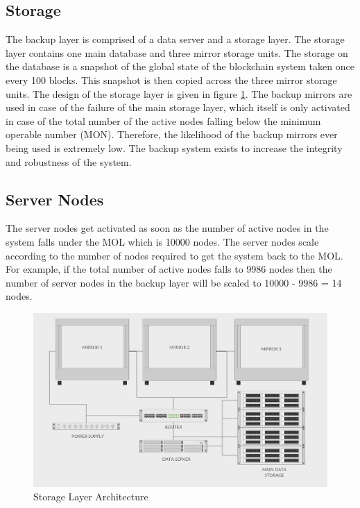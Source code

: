 \documentclass[a4paper,twoside,phd]{BYUPhys}
\begin{document}
\subsection{Storage}
The backup layer is comprised of a data server and a storage layer. The storage layer contains one main database and three mirror storage units. The storage on the database is a snapshot of the global state of the blockchain system taken once every 100 blocks. This snapshot is then copied across the three mirror storage units. The design of the storage layer is given in figure \ref{fig:3}. The backup mirrors are used in case of the failure of the main storage layer, which itself is only activated in case of the total number of the active nodes falling below the minimum operable number (MON). Therefore, the likelihood of the backup mirrors ever being used is extremely low. The backup system exists to increase the integrity and robustness of the system.

\subsection{Server Nodes}
The server nodes get activated as soon as the number of active nodes in the system falls under the MOL which is 10000 nodes. The server nodes scale according to the number of nodes required to get the system back to the MOL. For example, if the total number of active nodes falls to 9986 nodes then the number of server nodes in the backup layer will be scaled to 10000 - 9986 = 14 nodes.
\begin{figure}
  \includegraphics[width=\linewidth]{storage_layer.png}
  \caption{Storage Layer Architecture}
  \label{fig:3}
\end{figure}
\end{document}
